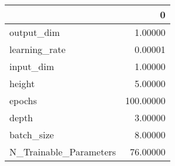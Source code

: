 \begin{tabular}{lr}
\toprule
{} &          0 \\
\midrule
output\_dim             &    1.00000 \\
learning\_rate          &    0.00001 \\
input\_dim              &    1.00000 \\
height                 &    5.00000 \\
epochs                 &  100.00000 \\
depth                  &    3.00000 \\
batch\_size             &    8.00000 \\
N\_Trainable\_Parameters &   76.00000 \\
\bottomrule
\end{tabular}

